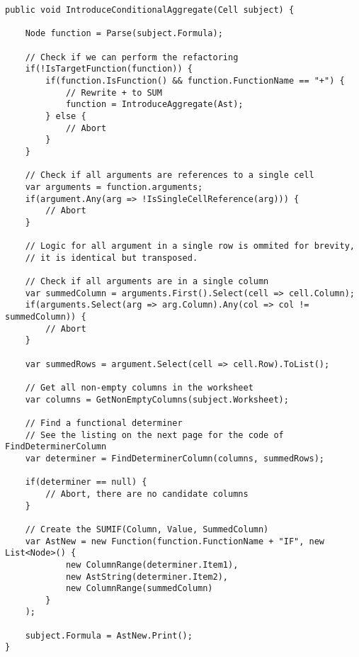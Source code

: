 \lstset{style=sharpc}
\begin{lstlisting}[float,caption={Introduce Conditional Aggregate (simplified)}, label={lst:introduceconditionalaggregate}]
public void IntroduceConditionalAggregate(Cell subject) {

	Node function = Parse(subject.Formula);
	
	// Check if we can perform the refactoring
	if(!IsTargetFunction(function)) {
		if(function.IsFunction() && function.FunctionName == "+") {
			// Rewrite + to SUM
			function = IntroduceAggregate(Ast);
		} else {
			// Abort
		}
	}
	
	// Check if all arguments are references to a single cell
	var arguments = function.arguments;
	if(argument.Any(arg => !IsSingleCellReference(arg))) {
		// Abort
	}
	
	// Logic for all argument in a single row is ommited for brevity,
	// it is identical but transposed.
	
	// Check if all arguments are in a single column
	var summedColumn = arguments.First().Select(cell => cell.Column);
	if(arguments.Select(arg => arg.Column).Any(col => col != summedColumn)) {
		// Abort
	}
	
	var summedRows = argument.Select(cell => cell.Row).ToList();
	
	// Get all non-empty columns in the worksheet
	var columns = GetNonEmptyColumns(subject.Worksheet);
	
	// Find a functional determiner
	// See the listing on the next page for the code of FindDeterminerColumn
	var determiner = FindDeterminerColumn(columns, summedRows);

	if(determiner == null) {
		// Abort, there are no candidate columns
	}
	
	// Create the SUMIF(Column, Value, SummedColumn)
	var AstNew = new Function(function.FunctionName + "IF", new List<Node>() {
			new ColumnRange(determiner.Item1),
			new AstString(determiner.Item2),
			new ColumnRange(summedColumn)
		}
	);
	
	subject.Formula = AstNew.Print();
}
\end{lstlisting}

